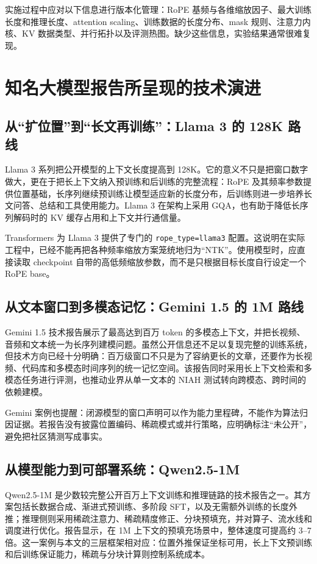 \documentclass[UTF8,10pt,a4paper,fontset=none]{ctexart}
\begin{document}
实施过程中应对以下信息进行版本化管理：RoPE 基频与各维缩放因子、最大训练长度和推理长度、attention scaling、训练数据的长度分布、mask 规则、注意力内核、KV 数据类型、并行拓扑以及评测热图。缺少这些信息，实验结果通常很难复现。

\section{知名大模型报告所呈现的技术演进}
\subsection{从“扩位置”到“长文再训练”：Llama 3 的 128K 路线}
Llama 3 系列把公开模型的上下文长度提高到 128K\cite{llama3}。它的意义不只是把窗口数字做大，更在于把长上下文纳入预训练和后训练的完整流程：RoPE 及其频率参数提供位置基础，长序列继续预训练让模型适应新的长度分布，后训练则进一步培养长文问答、总结和工具使用能力。Llama 3 在架构上采用 GQA，也有助于降低长序列解码时的 KV 缓存占用和上下文并行通信量。

Transformers 为 Llama 3 提供了专门的 \texttt{rope\_type=llama3} 配置\cite{hfrope}。这说明在实际工程中，已经不能再把各种频率缩放方案笼统地归为“NTK”。使用模型时，应直接读取 checkpoint 自带的高低频缩放参数，而不是只根据目标长度自行设定一个 RoPE base。

\subsection{从文本窗口到多模态记忆：Gemini 1.5 的 1M 路线}
Gemini 1.5 技术报告展示了最高达到百万 token 的多模态上下文，并把长视频、音频和文本统一为长序列建模问题\cite{gemini15}。虽然公开信息还不足以复现完整的训练系统，但技术方向已经十分明确：百万级窗口不只是为了容纳更长的文章，还要作为长视频、代码库和多模态时间序列的统一记忆空间。该报告同时采用长上下文检索和多模态任务进行评测，也推动业界从单一文本的 NIAH 测试转向跨模态、跨时间的依赖建模。

Gemini 案例也提醒：闭源模型的窗口声明可以作为能力里程碑，不能作为算法归因证据。若报告没有披露位置编码、稀疏模式或并行策略，应明确标注“未公开”，避免把社区猜测写成事实。

\subsection{从模型能力到可部署系统：Qwen2.5-1M}
Qwen2.5-1M 是少数较完整公开百万上下文训练和推理链路的技术报告之一\cite{qwen1m}。其方案包括长数据合成、渐进式预训练、多阶段 SFT，以及无需额外训练的长度外推；推理侧则采用稀疏注意力、稀疏精度修正、分块预填充，并对算子、流水线和调度进行优化。报告显示，在 1M 上下文的预填充场景中，整体速度可提高约 3--7 倍。这一案例与本文的三层框架相对应：位置外推保证坐标可用，长上下文预训练和后训练保证能力，稀疏与分块计算则控制系统成本。
\end{document}
